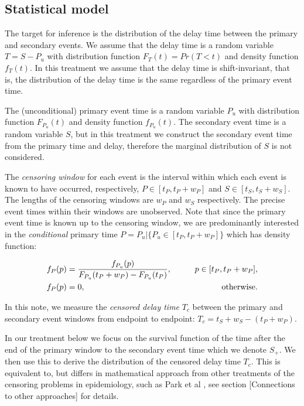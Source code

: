 \documentclass[10pt,letterpaper]{article}
\begin{document}
\subsection*{Statistical model}
The target for inference is the distribution of the delay time between the primary and secondary events. We assume that the delay time is a random variable $T = S - P_{u}$ with distribution function $F_T(t) = Pr(T < t)$ and density function $f_T(t)$. In this treatment we assume that the delay time is shift-invariant, that is, the distribution of the delay time is the same regardless of the primary event time.

The (unconditional) primary event time is a random variable $P_{u}$ with distribution function $F_{P_{u}}(t)$ and density function $f_{P_{u}}(t)$. The secondary event time is a random variable $S$, but in this treatment we construct the secondary event time from the primary time and delay, therefore the marginal distribution of $S$ is not considered.

The \textit{censoring window} for each event is the interval within which each event is known to have occurred, respectively, $P \in [t_P, t_P + w_P]$ and $S \in [t_S, t_S + w_S]$. The lengths of the censoring windows are $w_P$ and $w_S$ respectively. The precise event times within their windows are unobserved. Note that since the primary event time is known up to the censoring window, we are predominantly interested in the \textit{conditional} primary time $P = P_{u} | \{ P_{u} \in [t_P, t_P + w_P]\}$ which has density function:

\begin{eqnarray}
    \begin{aligned}
    f_{P}(p) &= {f_{P_{u}}(p) \over F_{P_{u}}(t_P + w_P) - F_{P_{u}}(t_P)}, \qquad &p \in [t_P, t_P + w_P],\\
    f_{P}(p) &= 0, \qquad &\text{otherwise}.
    \end{aligned}
\end{eqnarray}


In this note, we measure the \textit{censored delay time} $T_c$ between the primary and secondary event windows from endpoint to endpoint: $T_c = t_S + w_S - (t_P + w_P)$. 


In our treatment below we focus on the survival function of the time after the end of the primary window to the secondary event time which we denote $S_{+}$. We then use this to derive the distribution of the censored delay time $T_c$. This is equivalent to, but differs in mathematical approach from other treatments of the censoring problems in epidemiology, such as Park et al \cite{Park2024.01.12.24301247}, see section [Connections to other approaches] for details.
\end{document}
